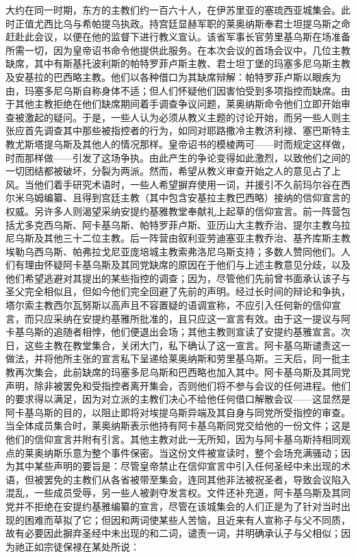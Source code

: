 大约在同一时期，东方的主教们约一百六十人，在伊苏里亚的塞琉西亚城集会。此时正值尤西比乌与希帕提乌执政。持宫廷显赫军职的莱奥纳斯奉君士坦提乌斯之命赶赴此会议，以便在他的监督下进行教义宣认。该省军事长官劳里基乌斯在场准备所需一切，因为皇帝诏书命令他提供此服务。在本次会议的首场会议中，几位主教缺席，其中有斯基托波利斯的帕特罗菲卢斯主教、君士坦丁堡的玛塞多尼乌斯主教及安基拉的巴西略主教。他们以各种借口为其缺席辩解：帕特罗菲卢斯以眼疾为由，玛塞多尼乌斯自称身体不适；但人们怀疑他们因害怕受到多项指控而缺席。由于其他主教拒绝在他们缺席期间着手调查争议问题，莱奥纳斯命令他们立即开始审查被激起的疑问。于是，一些人认为必须从教义主题的讨论开始，而另一些人则主张应首先调查其中那些被指控者的行为，如同对耶路撒冷主教济利禄、塞巴斯特主教尤斯塔提乌斯及其他人的情况那样。皇帝诏书的模棱两可——时而规定这样做，时而那样做——引发了这场争执。由此产生的争论变得如此激烈，以致他们之间的一切团结都被破坏，分裂为两派。然而，希望从教义审查开始之人的意见占了上风。当他们着手研究术语时，一些人希望摒弃使用一词，并援引不久前玛尔谷在西尔米乌姆编纂、且得到宫廷主教（其中包含安基拉主教巴西略）接纳的信仰宣言的权威。另许多人则渴望采纳安提约基雅教堂奉献礼上起草的信仰宣言。前一阵营包括尤多克西乌斯、阿卡基乌斯、帕特罗菲卢斯、亚历山大主教乔治、提尔主教乌拉尼乌斯及其他三十二位主教。后一阵营由叙利亚劳迪塞亚主教乔治、基齐库斯主教埃勒乌西乌斯、帕弗拉戈尼亚庞培城主教索弗洛尼乌斯支持；多数人赞同他们。人们有理由怀疑阿卡基乌斯及其同党缺席的原因在于他们与上述主教意见分歧，以及他们希望逃避对其提出的某些指控的调查；因为，尽管他们先前曾书面承认该子与圣父完全相似且，但如今他们完全回避了先前的声明。经过长时间的辩论和争执，塔尔索主教西尔瓦努斯以高声且不容置疑的语调宣称，不应引入任何新的信仰宣言，而只应采纳在安提约基雅所批准的，且只应这一宣言有效。由于这一提议与阿卡基乌斯的追随者相悖，他们便退出会场；其他主教则宣读了安提约基雅宣言。次日，这些主教在教堂集合，关闭大门，私下确认了这一宣言。阿卡基乌斯谴责这一做法，并将他所主张的宣言私下呈递给莱奥纳斯和劳里基乌斯。三天后，同一批主教再次集会，此前缺席的玛塞多尼乌斯和巴西略也加入其中。阿卡基乌斯及其同党声明，除非被罢免和受指控者离开集会，否则他们将不参与会议的任何进程。他们的要求得以满足，因为对立派的主教们决心不给他任何借口解散会议——这显然是阿卡基乌斯的目的，以阻止即将对埃提乌斯异端及其自身与同党所受指控的审查。当全体成员集合时，莱奥纳斯表示他持有阿卡基乌斯同党交给他的一份文件；这是他们的信仰宣言并附有引言。其他主教对此一无所知，因为与阿卡基乌斯持相同观点的莱奥纳斯乐意为整个事件保密。当这份文件被宣读时，整个会场充满骚动；因为其中某些声明的要旨是：尽管皇帝禁止在信仰宣言中引入任何圣经中未出现的术语，但被罢免的主教们从各省被带至集会，连同其他非法被祝圣者，导致会议陷入混乱，一些成员受辱，另一些人被剥夺发言权。文件还补充道，阿卡基乌斯及其同党并不拒绝在安提约基雅编纂的宣言，尽管在该城集会的人们正是为了针对当时出现的困难而草拟了它；但因和两词使某些人苦恼，且近来有人宣称子与父不同质，故有必要因此摒弃圣经中未出现的和二词，谴责一词，并明确承认子与父相似；因为祂正如宗徒保禄在某处所说：
